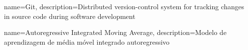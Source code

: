 
{
	name=Git,
	description={Distributed version-control system for tracking changes in source code
	during software development}
}

{
    name={Autoregressive Integrated Moving Average},
    description={Modelo de aprendizagem de média móvel integrado autoregressivo}
}